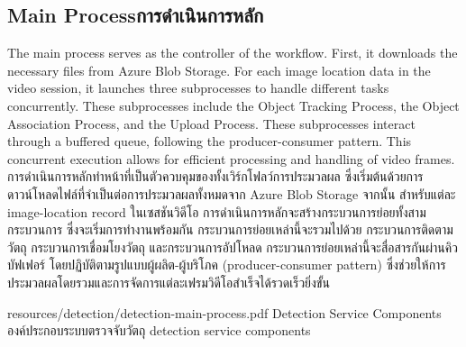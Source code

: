 \subsection{\ifenglish Main Process\else การดำเนินการหลัก\fi}
\ifenglish
The main process serves as the controller of the workflow. First, it downloads the necessary files from Azure Blob Storage. For each image location data in the video session, it launches three subprocesses to handle different tasks concurrently. These subprocesses include the Object Tracking Process, the Object Association Process, and the Upload Process. These subprocesses interact through a buffered queue, following the producer-consumer pattern. This concurrent execution allows for efficient processing and handling of video frames.
\else
การดำเนินการหลักทำหน้าที่เป็นตัวควบคุมของทั้งเวิร์กโฟลว์การประมวลผล ซึ่งเริ่มต้นด้วยการดาวน์โหลดไฟล์ที่จำเป็นต่อการประมวลผลทั้งหมดจาก Azure Blob Storage จากนั้น สำหรับแต่ละ image-location record ในเซสชันวิดีโอ การดำเนินการหลักจะสร้างกระบวนการย่อยทั้งสามกระบวนการ ซึ่งจะเริ่มการทำงานพร้อมกัน กระบวนการย่อยเหล่านี้จะรวมไปด้วย กระบวนการติดตามวัตถุ กระบวนการเชื่อมโยงวัตถุ และกระบวนการอัปโหลด กระบวนการย่อยเหล่านี้จะสื่อสารกันผ่านคิวบัฟเฟอร์ โดยปฏิบัติตามรูปแบบผู้ผลิต-ผู้บริโภค (producer-consumer pattern) ซึ่งช่วยให้การประมวลผลโดยรวมและการจัดการแต่ละเฟรมวิดีโอสำเร็จได้รวดเร็วยิ่งขั้น
\fi

\insertPDFfigure
{resources/detection/detection-main-process.pdf}
{\ifenglish Detection Service Components \else องค์ประกอบระบบตรวจจับวัตถุ\fi}
{detection service components}